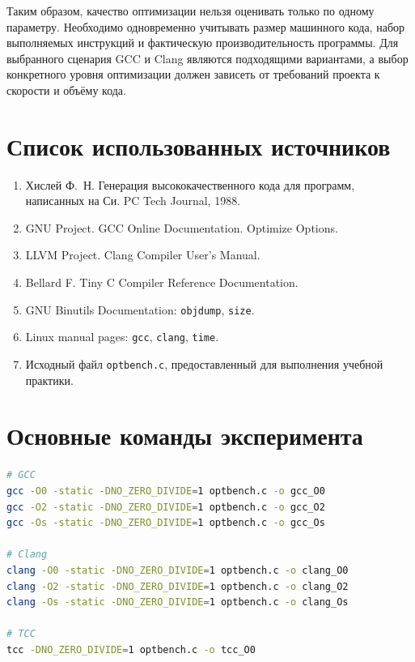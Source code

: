 \documentclass[12pt,a4paper]{article}
\begin{document}
Таким образом, качество оптимизации нельзя оценивать только по одному параметру. Необходимо одновременно учитывать размер машинного кода, набор выполняемых инструкций и фактическую производительность программы. Для выбранного сценария GCC и Clang являются подходящими вариантами, а выбор конкретного уровня оптимизации должен зависеть от требований проекта к скорости и объёму кода.

\section*{Список использованных источников}

\begin{enumerate}
    \item Хислей Ф.~Н. Генерация высококачественного кода для программ, написанных на Си. PC Tech Journal, 1988.
    \item GNU Project. GCC Online Documentation. Optimize Options.
    \item LLVM Project. Clang Compiler User's Manual.
    \item Bellard F. Tiny C Compiler Reference Documentation.
    \item GNU Binutils Documentation: \texttt{objdump}, \texttt{size}.
    \item Linux manual pages: \texttt{gcc}, \texttt{clang}, \texttt{time}.
    \item Исходный файл \texttt{optbench.c}, предоставленный для выполнения учебной практики.
\end{enumerate}

\appendix
\section{Основные команды эксперимента}

\begin{lstlisting}[language=bash]
# GCC
gcc -O0 -static -DNO_ZERO_DIVIDE=1 optbench.c -o gcc_O0
gcc -O2 -static -DNO_ZERO_DIVIDE=1 optbench.c -o gcc_O2
gcc -Os -static -DNO_ZERO_DIVIDE=1 optbench.c -o gcc_Os

# Clang
clang -O0 -static -DNO_ZERO_DIVIDE=1 optbench.c -o clang_O0
clang -O2 -static -DNO_ZERO_DIVIDE=1 optbench.c -o clang_O2
clang -Os -static -DNO_ZERO_DIVIDE=1 optbench.c -o clang_Os

# TCC
tcc -DNO_ZERO_DIVIDE=1 optbench.c -o tcc_O0
\end{lstlisting}
\end{document}
